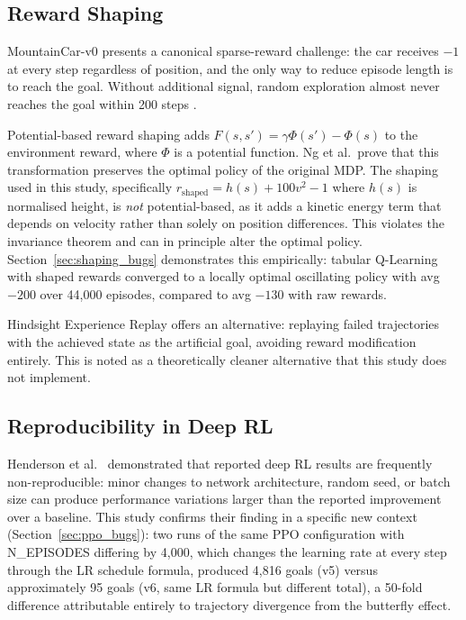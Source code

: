 \documentclass[a4paper,12pt]{article}
\begin{document}
\subsection{Reward Shaping}

MountainCar-v0 \cite{moore1990efficient} presents a canonical sparse-reward challenge: the car receives $-1$ at every step regardless of position, and the only way to reduce episode length is to reach the goal. Without additional signal, random exploration almost never reaches the goal within 200 steps \cite{dann2022exploration}.

Potential-based reward shaping \cite{ng1999policy} adds $F(s,s') = \gamma\Phi(s') - \Phi(s)$ to the environment reward, where $\Phi$ is a potential function. Ng et al.\ prove that this transformation preserves the optimal policy of the original MDP. The shaping used in this study, specifically $r_{\text{shaped}} = h(s) + 100v^2 - 1$ where $h(s)$ is normalised height, is \emph{not} potential-based, as it adds a kinetic energy term that depends on velocity rather than solely on position differences. This violates the invariance theorem and can in principle alter the optimal policy. Section~\ref{sec:shaping_bugs} demonstrates this empirically: tabular Q-Learning with shaped rewards converged to a locally optimal oscillating policy with avg $-200$ over 44,000 episodes, compared to avg $-130$ with raw rewards.

Hindsight Experience Replay \cite{andrychowicz2017hindsight} offers an alternative: replaying failed trajectories with the achieved state as the artificial goal, avoiding reward modification entirely. This is noted as a theoretically cleaner alternative that this study does not implement.

\subsection{Reproducibility in Deep RL}

Henderson et al.\ \cite{henderson2018deep} demonstrated that reported deep RL results are frequently non-reproducible: minor changes to network architecture, random seed, or batch size can produce performance variations larger than the reported improvement over a baseline. This study confirms their finding in a specific new context (Section~\ref{sec:ppo_bugs}): two runs of the same PPO configuration with N\_EPISODES differing by 4,000, which changes the learning rate at every step through the LR schedule formula, produced 4,816 goals (v5) versus approximately 95 goals (v6, same LR formula but different total), a 50-fold difference attributable entirely to trajectory divergence from the butterfly effect.
\end{document}
